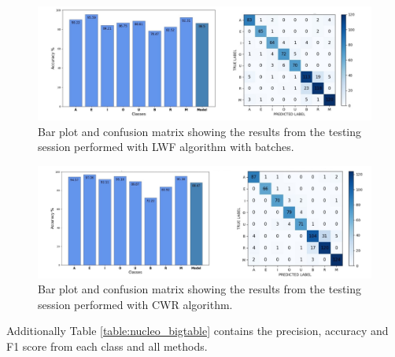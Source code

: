 \documentclass[12pt]{report}
\begin{document}
\begin{figure}[h!]
    \centering
    \includegraphics[width=140mm]{Figures/Chapter5/STM_barPlot_LWF_batch.jpg} 
    \caption{Bar plot and confusion matrix showing the results from the testing session performed with LWF algorithm with batches.}
    \label{fig:letter_res_LWF_batch}    
\end{figure}

\begin{figure}[h!]
    \centering
    \includegraphics[width=140mm]{Figures/Chapter5/STM_barPlot_CWR.jpg} 
    \caption{Bar plot and confusion matrix showing the results from the testing session performed with CWR algorithm.}
    \label{fig:letter_res_CWR}    
\end{figure}

Additionally Table \ref{table:nucleo_bigtable} contains the precision, accuracy and F1 score from each class and all methods.
\end{document}
